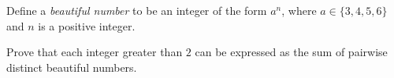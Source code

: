 Define a \emph{beautiful number} to be an integer of the form $a^n$, where $a\in\{3,4,5,6\}$ and $n$ is a positive integer.

Prove that each integer greater than $2$ can be expressed as the sum of pairwise distinct beautiful numbers.
